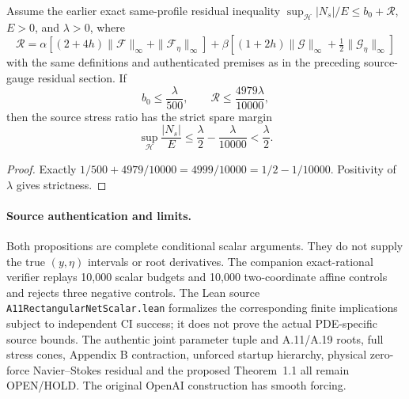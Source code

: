 \begin{proposition}
Assume the earlier exact same-profile residual inequality
\(\sup_{\mathcal H}|N_s|/E\le b_0+\mathcal R\),
\(E>0\), and \(\lambda>0\), where
\[
\mathcal R=\alpha[(2+4h)\|\mathcal F\|_\infty+
\|\mathcal F_\eta\|_\infty]+
\beta[(1+2h)\|\mathcal G\|_\infty+
\tfrac12\|\mathcal G_\eta\|_\infty]
\]
with the same definitions and authenticated premises as in the
preceding source-gauge residual section. If
\[
b_0\le\frac{\lambda}{500},\qquad
\mathcal R\le\frac{4979\lambda}{10000},
\]
then the source stress ratio has the strict spare margin
\[
\boxed{\quad
\sup_{\mathcal H}\frac{|N_s|}{E}
\le\frac{\lambda}{2}-\frac{\lambda}{10000}
<\frac{\lambda}{2}.\quad}
\]
\end{proposition}
\begin{proof}
Exactly \(1/500+4979/10000=4999/10000
=1/2-1/10000\). Positivity of \(\lambda\) gives strictness.
\end{proof}

\paragraph{Source authentication and limits.}
Both propositions are complete conditional scalar arguments.
They do not supply the true \((y,\eta)\) intervals or root derivatives.
The companion exact-rational verifier replays
10,000 scalar budgets and 10,000 two-coordinate affine controls and
rejects three negative controls. The Lean source
\texttt{A11RectangularNetScalar.lean} formalizes the corresponding
finite implications subject to independent CI success; it does not
prove the actual PDE-specific source bounds. The authentic joint
parameter tuple and A.11/A.19 roots, full stress cones, Appendix B
contraction, unforced startup hierarchy, physical zero-force
Navier--Stokes residual and the proposed Theorem~1.1 all remain
OPEN/HOLD. The original OpenAI construction has smooth forcing.
